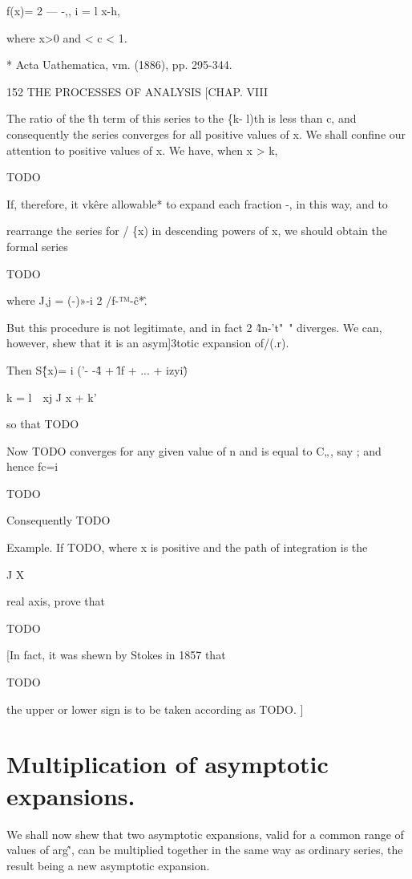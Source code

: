 f(x)= 2 — -,,
i = l x-\-h,

where x>0 and < c < 1.

* Acta Uathematica, vm. (1886), pp. 295-344.



152 THE PROCESSES OF ANALYSIS [CHAP. VIII

The ratio of the \^th term of this series to the \{k- l)th is less than c, and consequently
the series converges for all positive values of x. We shall confine our attention to positive
values of x. We have, when x > k,

TODO

If, therefore, it vk\^ere allowable* to expand each fraction -, in this way, and to

rearrange the series for / \{x) in descending powers of x, we should obtain the formal series

TODO

where J,j = (-)»-i 2 /f-™-\^c*\^.

But this procedure is not legitimate, and in fact 2 \^4n-'t"~" diverges. We can, however,
shew that it is an asym]3totic expansion of/(.r).



Then S\^\{x)= i ('- -\^4 + \^lf + ... + izyi\^)



k = l\ \ xj J x + k'



so that TODO

Now TODO converges for any given value of n and is equal to C„, say ; and hence
fc=i

TODO

Consequently TODO

Example. If TODO, where x is positive and the path of integration is the

J X

real axis, prove that

TODO

[In fact, it was shewn by Stokes in 1857 that

TODO

the upper or lower sign is to be taken according as TODO. ]

\section{Multiplication of asymptotic expansions.}

We shall now shew that two asymptotic expansions, valid for a common
range of values of arg\^', can be multiplied together in the same way as
ordinary series, the result being a new asymptotic expansion.

